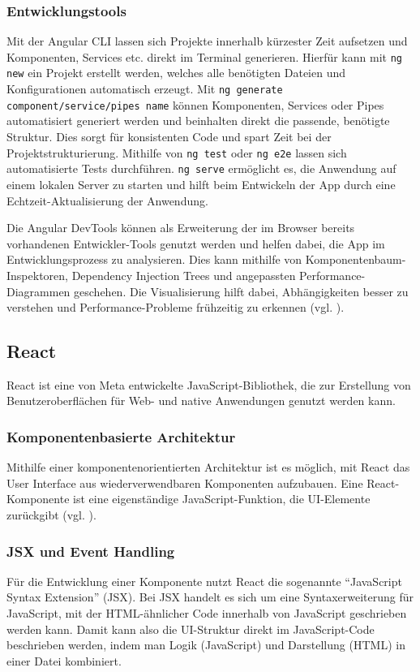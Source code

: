 \documentclass[oneside]{ausarbeitung}
\begin{document}
\subsubsection{Entwicklungstools}
Mit der Angular \ac{CLI} lassen sich Projekte innerhalb kürzester Zeit aufsetzen und Komponenten, Services etc. direkt im Terminal generieren. Hierfür kann mit \texttt{ng new} ein Projekt erstellt werden, welches alle benötigten Dateien und Konfigurationen automatisch erzeugt. Mit \texttt{ng generate component/service/pipes name} können Komponenten, Services oder Pipes automatisiert generiert werden und beinhalten direkt die passende, benötigte Struktur. Dies sorgt für konsistenten Code und spart Zeit bei der Projektstrukturierung. Mithilfe von \texttt{ng test} oder \texttt{ng e2e} lassen sich automatisierte Tests durchführen. \texttt{ng serve} ermöglicht es, die Anwendung auf einem lokalen Server zu starten und hilft beim Entwickeln der App durch eine Echtzeit-Aktualisierung der Anwendung. 

Die Angular DevTools können als Erweiterung der im Browser bereits vorhandenen Entwickler-Tools genutzt werden und helfen dabei, die App im Entwicklungsprozess  zu analysieren. Dies kann mithilfe von Komponentenbaum-Inspektoren, Dependency Injection Trees und angepassten Performance-Diagrammen geschehen. Die Visualisierung hilft dabei, Abhängigkeiten besser zu verstehen und Performance-Probleme frühzeitig zu erkennen (vgl. \parencite{angular}).


\subsection{React}
React ist eine von Meta entwickelte JavaScript-Bibliothek, die zur Erstellung von Benutzeroberflächen für Web- und native Anwendungen genutzt werden kann.

\subsubsection{Komponentenbasierte Architektur}
Mithilfe einer komponentenorientierten Architektur ist es möglich, mit React das User Interface aus wiederverwendbaren Komponenten aufzubauen. Eine React-Komponente ist eine eigenständige JavaScript-Funktion, die UI-Elemente zurückgibt (vgl. \parencite{react}).

\subsubsection{JSX und Event Handling}
Für die Entwicklung einer Komponente nutzt React die sogenannte “JavaScript Syntax Extension” (JSX). Bei JSX handelt es sich um eine Syntaxerweiterung für JavaScript, mit der \ac{HTML}-ähnlicher Code innerhalb von JavaScript geschrieben werden kann. Damit kann also die UI-Struktur direkt im JavaScript-Code beschrieben werden, indem man Logik (JavaScript) und Darstellung (\ac{HTML}) in einer Datei kombiniert. 
\end{document}
